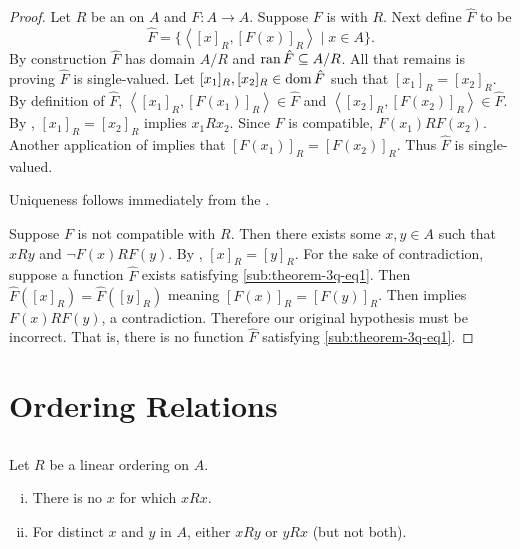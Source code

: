 \documentclass{report}
\newcommand{\pair}[1]{\left< #1 \right>}
\begin{document}
\begin{proof}

  Let $R$ be an  on $A$ and
    $F \colon A \rightarrow A$.
  Suppose $F$ is  with $R$.
  Next define  $\hat{F}$ to be
    $$\hat{F} = \{\pair{[x]_R, [F(x)]_R} \mid x \in A\}.$$
  By construction $\hat{F}$ has domain $A / R$ and
    $\mathop{\text{ran}}{\hat{F}} \subseteq A / R$.
  All that remains is proving $\hat{F}$ is single-valued.
  Let $[x_1]_R, [x_2]_R \in \mathop{\text{dom}}{\hat{F}}$ such that $[x_1]_R = [x_2]_R$.
  By definition of $\hat{F}$, $\pair{[x_1]_R, [F(x_1)]_R} \in \hat{F}$
    and $\pair{[x_2]_R, [F(x_2)]_R} \in \hat{F}$.
  By , $[x_1]_R = [x_2]_R$ implies $x_1Rx_2$.
  Since $F$ is compatible, $F(x_1)RF(x_2)$.
  Another application of  implies that
    $[F(x_1)]_R = [F(x_2)]_R$.
  Thus $\hat{F}$ is single-valued.

  Uniqueness follows immediately from the .

  \suitdivider

  Suppose $F$ is not compatible with $R$.
  Then there exists some $x, y \in A$ such that $xRy$ and $\neg F(x)RF(y)$.
  By , $[x]_R = [y]_R$.
  For the sake of contradiction, suppose a function $\hat{F}$ exists satisfying
    \eqref{sub:theorem-3q-eq1}.
  Then $\hat{F}([x]_R) = \hat{F}([y]_R)$ meaning $[F(x)]_R = [F(y)]_R$.
  Then  implies $F(x)RF(y)$, a contradiction.
  Therefore our original hypothesis must be incorrect.
  That is, there is no function $\hat{F}$ satisfying \eqref{sub:theorem-3q-eq1}.

\end{proof}

\section{Ordering Relations}%

\subsection{}%

\begin{theorem}[3R]

  Let $R$ be a linear ordering on $A$.
  \begin{enumerate}[(i)]
    \item There is no $x$ for which $xRx$.
    \item For distinct $x$ and $y$ in $A$, either $xRy$ or $yRx$ (but not both).
  \end{enumerate}

\end{theorem}
\end{document}

